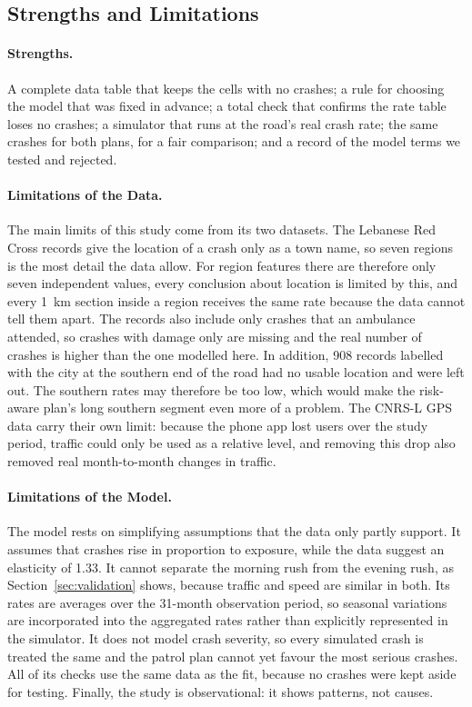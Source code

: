 \documentclass[11pt]{article}
\begin{document}
\subsection{Strengths and Limitations}

\paragraph{Strengths.}
A complete data table that keeps the cells with no crashes; a rule for choosing
the model that was fixed in advance; a total check that confirms the rate table
loses no crashes; a simulator that runs at the road's real crash rate; the same
crashes for both plans, for a fair comparison; and a record of the model terms
we tested and rejected.

\paragraph{Limitations of the Data.}
The main limits of this study come from its two datasets. The Lebanese Red
Cross records give the location of a crash only as a town name, so seven
regions is the most detail the data allow. For region features there are
therefore only seven independent values, every conclusion about location is
limited by this, and every 1~km section inside a region receives the same rate
because the data cannot tell them apart. The records also include only crashes
that an ambulance attended, so crashes with damage only are missing and the
real number of crashes is higher than the one modelled here. In addition, 908
records labelled with the city at the southern end of the road had no usable
location and were left out. The southern rates may therefore be too low, which
would make the risk-aware plan's long southern segment even more of a problem.
The CNRS-L GPS data carry their own limit: because the phone app lost users
over the study period, traffic could only be used as a relative level, and
removing this drop also removed real month-to-month changes in traffic.

\paragraph{Limitations of the Model.}
The model rests on simplifying assumptions that the data only partly support.
It assumes that crashes rise in proportion to exposure, while the data suggest
an elasticity of 1.33. It cannot separate the morning rush from the evening
rush, as Section~\ref{sec:validation} shows, because traffic and speed are
similar in both. Its rates are averages over the 31-month observation period, so seasonal
variations are incorporated into the aggregated rates rather than explicitly
represented in the simulator. It does not model crash severity, so every simulated crash is treated
the same and the patrol plan cannot yet favour the most serious crashes. All
of its checks use the same data as the fit, because no crashes were kept aside
for testing. Finally, the study is observational: it shows patterns, not
causes.
\end{document}
